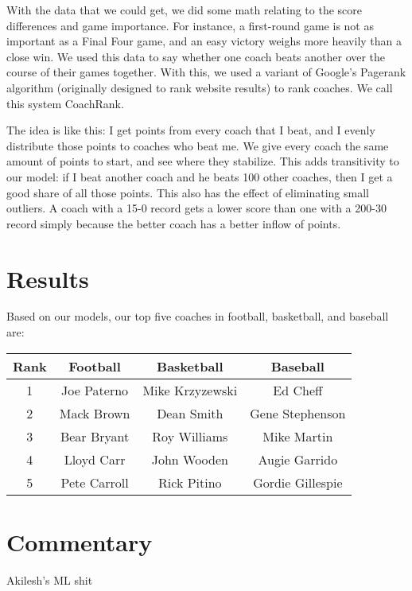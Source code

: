 \documentclass[12pt]{article}
\begin{document}
With the data that we could get, we did some math relating to the score differences and game importance. For instance, a first-round game is not as important as a Final Four game, and an easy victory weighs more heavily than a close win. We used this data to say whether one coach beats another over the course of their games together. With this, we used a variant of Google's Pagerank algorithm (originally designed to rank website results) to rank coaches. We call this system CoachRank.

The idea is like this: I get points from every coach that I beat, and I evenly distribute those points to coaches who beat me. We give every coach the same amount of points to start, and see where they stabilize. This adds transitivity to our model: if I beat another coach and he beats 100 other coaches, then I get a good share of all those points. This also has the effect of eliminating small outliers. A coach with a 15-0 record gets a lower score than one with a 200-30 record simply because the better coach has a better inflow of points.

\section{Results}
Based on our models, our top five coaches in football, basketball, and baseball are:
\begin{center}
\begin{tabular}{c | c | c | c}
Rank & Football & Basketball & Baseball\\\hline
1 & Joe Paterno  & Mike Krzyzewski & Ed Cheff \\
2 & Mack Brown   & Dean Smith      & Gene Stephenson\\
3 & Bear Bryant  & Roy Williams    & Mike Martin\\
4 & Lloyd Carr   & John Wooden     & Augie Garrido\\
5 & Pete Carroll & Rick Pitino     & Gordie Gillespie\\
\end{tabular}
\end{center}

\section{Commentary}
Akilesh's ML shit
\end{document}
